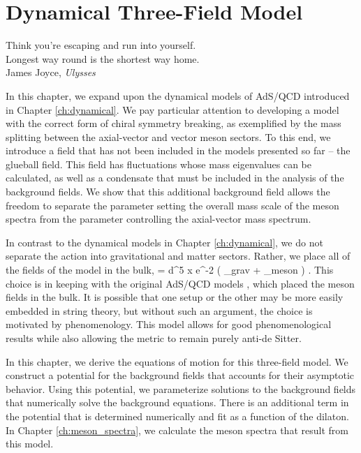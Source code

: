 \chapter{Dynamical Three-Field Model}
\label{ch:dynamical_threefield}

\begin{flushright}
Think you're escaping and run into yourself. \\Longest way round is the shortest way home. \\
James Joyce, \emph{Ulysses}
\end{flushright}

In this chapter, we expand upon the dynamical models of AdS/QCD introduced in Chapter \ref{ch:dynamical}.
We pay particular attention to developing a model with the correct form of chiral symmetry breaking, as exemplified by the mass splitting between the axial-vector and vector meson sectors.
To this end, we introduce a field that has not been included in the models presented so far -- the glueball field. 
This field has fluctuations whose mass eigenvalues can be calculated, as well as a condensate that must be included in the analysis of the background fields. 
We show that this additional background field allows the freedom to separate the parameter setting the overall mass scale of the meson spectra from the parameter controlling the axial-vector mass spectrum.

In contrast to the dynamical models in Chapter \ref{ch:dynamical}, we do not separate the action into gravitational and matter sectors. 
Rather, we place all of the fields of the model in the bulk,
\be
\cS = \int d^5 x e^{-2\Phi} \left( \cL_{grav} + \cL_{meson} \right) .
\ee
This choice is in keeping with the original AdS/QCD models \cite{stephanov-katz-son,karch-katz-son-adsqcd}, which placed the meson fields in the bulk.
It is possible that one setup or the other may be more easily embedded in string theory, but without such an argument, the choice is motivated by phenomenology. 
This model allows for good phenomenological results while also allowing the metric to remain purely anti-de Sitter.

In this chapter, we derive the equations of motion for this three-field model.
We construct a potential for the background fields that accounts for their asymptotic behavior. 
Using this potential, we parameterize solutions to the background fields that numerically solve the background equations.
There is an additional term in the potential that is determined numerically and fit as a function of the dilaton.
In Chapter \ref{ch:meson_spectra}, we calculate the meson spectra that result from this model.

